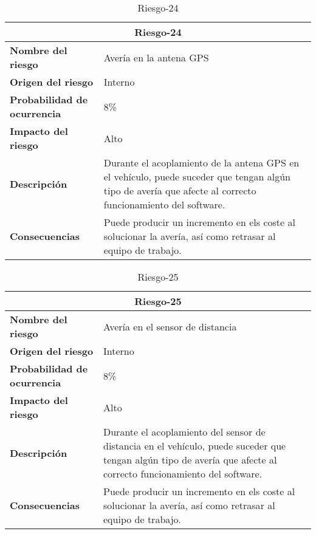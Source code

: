 \begin{table}[H]
\begin{center}
\begin{tabular}{p{} p{7cm}}
\multicolumn{2}{c}{\textbf{Riesgo-24} } \\
\hline \hline
\textbf{Nombre del riesgo} & Avería en la antena GPS \\
\hline
\textbf{Origen del riesgo} & Interno\\
\hline
\textbf{Probabilidad de ocurrencia} &  8\% \\
\hline
\textbf{Impacto del riesgo} &  Alto \\
\hline
\textbf{Descripción} & Durante el acoplamiento de la antena GPS en el vehículo, puede suceder que tengan  algún tipo de avería que afecte al correcto funcionamiento del software.   \\
\hline
\textbf{Consecuencias} &  Puede producir un incremento en els coste al solucionar la avería, así como retrasar al equipo de trabajo.  \\
\hline
\end{tabular}
\caption{Riesgo-24}
\label{tab:Riesgo-24}
\end{center}
\end{table}

\begin{table}[H]
\begin{center}
\begin{tabular}{p{} p{7cm}}
\multicolumn{2}{c}{\textbf{Riesgo-25} } \\
\hline \hline
\textbf{Nombre del riesgo} & Avería en el sensor de distancia  \\
\hline
\textbf{Origen del riesgo} & Interno\\
\hline
\textbf{Probabilidad de ocurrencia} &  8\% \\
\hline
\textbf{Impacto del riesgo} &  Alto \\
\hline
\textbf{Descripción} &  Durante el acoplamiento del sensor de distancia en el vehículo, puede suceder que tengan  algún tipo de avería que afecte al correcto funcionamiento del software. \\
\hline
\textbf{Consecuencias} & Puede producir un incremento en els coste al solucionar la avería, así como retrasar al equipo de trabajo.   \\
\hline
\end{tabular}
\caption{Riesgo-25}
\label{tab:Riesgo-25}
\end{center}
\end{table}

